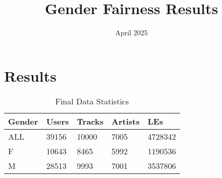 \documentclass{article}
\title{Gender Fairness Results}
\date{April 2025}
\begin{document}
\maketitle

\section{Results}


\begin{table}[ht!]
\centering
\begin{tabular}{lllll}
\hline
     Gender     & Users         & Tracks        & Artists       & LEs\\ \hline
     ALL        & 39156         & 10000         & 7005          & 4728342 \\
     F          & 10643         & 8465          & 5992          & 1190536 \\
     M          & 28513         & 9993         & 7001         & 3537806 \\

     \hline
\end{tabular}
\caption{Final Data Statistics}
\label{table:evaluation_benchmark}
\end{table}

\end{document}
